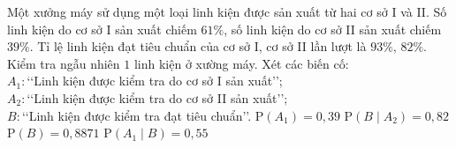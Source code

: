 \begin{ex}%
	Một xưởng máy sử dụng một loại linh kiện được sản xuất từ hai cơ sở I và II. Số linh kiện do cơ sở I sản xuất chiếm $61 \%$, số linh kiện do cơ sở II sản xuất chiếm $39 \%$. Tỉ lệ linh kiện đạt tiêu chuẩn của cơ sở I, cơ sở II lần lượt là $93 \%$, $82 \%$. Kiểm tra ngẫu nhiên $1$ linh kiện ở  xường máy. Xét các biến cố:\\
	$A_1\colon$\lq\lq Linh  kiện được kiểm tra do cơ sở I sản xuất\rq\rq;\\
	 $A_2\colon$\lq\lq Linh kiện được kiểm tra do cơ sở II sản xuất\rq\rq;\\
	$B\colon$\lq\lq Linh  kiện được kiểm tra đạt tiêu chuẩn\rq\rq.
	\choiceTF 
		 {$\mathrm{P}\left(A_{1}\right)=0{,}39$}
		 {\True $\mathrm{P}\left(B \mid A_{2}\right)=0{,}82$}
		{\True  $\mathrm{P}(B)=0{,}8871$}
		 {$\mathrm{P}\left(A_{1} \mid B\right)=0{,}55$}
\end{ex}

